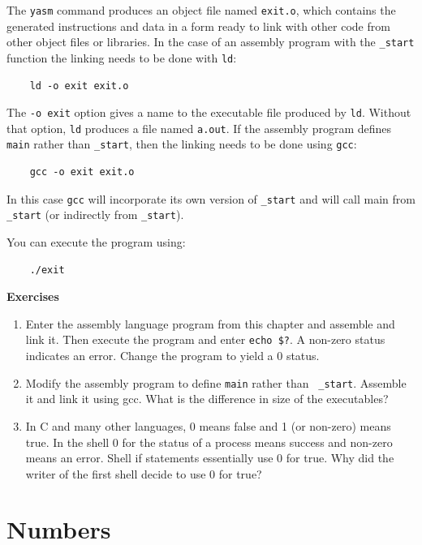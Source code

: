 \documentclass[11pt,b5paper]{book}
\begin{document}
The {\tt yasm} command produces an object file named {\tt exit.o}, which
contains the generated instructions and data in a form ready to link with
other code from other object files or libraries.
In the case of an assembly program with the {\tt \_start} function the linking
needs to be done with {\tt ld}: 
\begin{verbatim}
    ld -o exit exit.o
\end{verbatim}

The {\tt -o exit} option gives a name to the executable file produced by {\tt ld}.
Without that option, {\tt ld} produces a file named {\tt a.out}.
If the assembly program defines {\tt main} rather than {\tt \_start}, then the 
linking needs to be done using {\tt gcc}: 
\begin{verbatim}
    gcc -o exit exit.o
\end{verbatim}

In this case {\tt gcc} will incorporate its own version of {\tt \_start} and 
will call main from {\tt \_start} (or indirectly from {\tt \_start}).

You can execute the program using:
\begin{verbatim}
    ./exit
\end{verbatim}

\vfill
\break
{\bf\large Exercises}

\begin{enumerate}
\item Enter the assembly language program from this chapter and assemble and
link it.
Then execute the program and enter {\tt echo \$?}.  
A non-zero status indicates an error.
Change the program to yield a 0 status.
\item Modify the assembly program to define {\tt main} rather than {\tt
\_start}.  Assemble it and link it using gcc.
What is the difference in size of the executables?
\item In C and many other languages, 0 means false and 1 (or non-zero) means true.
In the shell 0 for the status of a process means success and non-zero means an error.
Shell if statements essentially use 0 for true.
Why did the writer of the first shell decide to use 0 for true?

\end{enumerate}

\chapter{Numbers}
\end{document}
